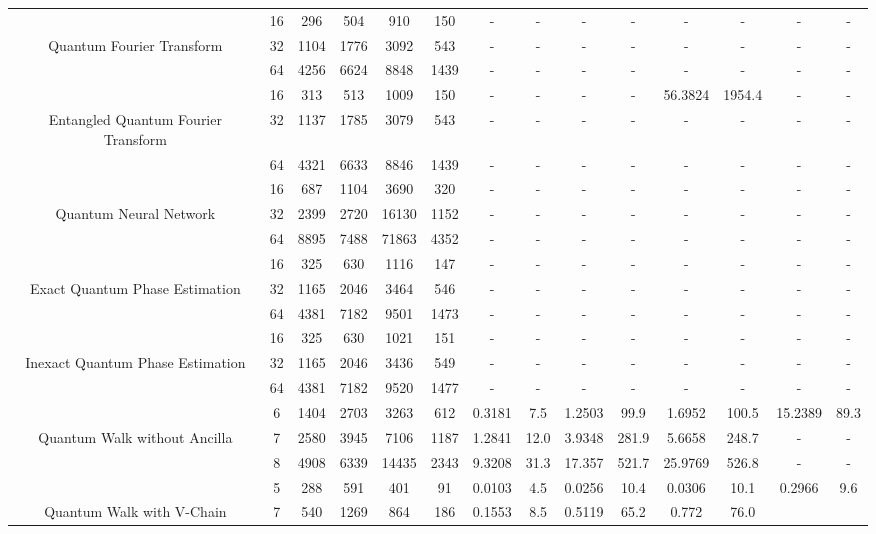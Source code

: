 \begin{table}[htb]
{\begin{tabular}{|c|c|c|c|c|c|c|c|c|c|c|c|c|c|}
\hline
 & 
16 & 296 & 504 & 910 & 150
 & - & -
 & - & -
 & - & -
 & - & -
 \\
Quantum Fourier Transform & 
32 & 1104 & 1776 & 3092 & 543
 & - & -
 & - & -
 & - & -
 & - & -
 \\
 & 
64 & 4256 & 6624 & 8848 & 1439
 & - & -
 & - & -
 & - & -
 & - & -
 \\
\hline
 & 
16 & 313 & 513 & 1009 & 150
 & - & -
 & - & -
 & 56.3824 & 1954.4
 & - & -
 \\
Entangled Quantum Fourier Transform & 
32 & 1137 & 1785 & 3079 & 543
 & - & -
 & - & -
 & - & -
 & - & -
 \\
 & 
64 & 4321 & 6633 & 8846 & 1439
 & - & -
 & - & -
 & - & -
 & - & -
 \\
\hline
 & 
16 & 687 & 1104 & 3690 & 320
 & - & -
 & - & -
 & - & -
 & - & -
 \\
Quantum Neural Network & 
32 & 2399 & 2720 & 16130 & 1152
 & - & -
 & - & -
 & - & -
 & - & -
 \\
 & 
64 & 8895 & 7488 & 71863 & 4352
 & - & -
 & - & -
 & - & -
 & - & -
 \\
\hline
 & 
16 & 325 & 630 & 1116 & 147
 & - & -
 & - & -
 & - & -
 & - & -
 \\
Exact Quantum Phase Estimation & 
32 & 1165 & 2046 & 3464 & 546
 & - & -
 & - & -
 & - & -
 & - & -
 \\
 & 
64 & 4381 & 7182 & 9501 & 1473
 & - & -
 & - & -
 & - & -
 & - & -
 \\
\hline
 & 
16 & 325 & 630 & 1021 & 151
 & - & -
 & - & -
 & - & -
 & - & -
 \\
Inexact Quantum Phase Estimation & 
32 & 1165 & 2046 & 3436 & 549
 & - & -
 & - & -
 & - & -
 & - & -
 \\
 & 
64 & 4381 & 7182 & 9520 & 1477
 & - & -
 & - & -
 & - & -
 & - & -
 \\
\hline
 & 
6 & 1404 & 2703 & 3263 & 612
 & 0.3181 & 7.5
 & 1.2503 & 99.9
 & 1.6952 & 100.5
 & 15.2389 & 89.3
 \\
Quantum Walk without Ancilla & 
7 & 2580 & 3945 & 7106 & 1187
 & 1.2841 & 12.0
 & 3.9348 & 281.9
 & 5.6658 & 248.7
 & - & -
 \\
 & 
8 & 4908 & 6339 & 14435 & 2343
 & 9.3208 & 31.3
 & 17.357 & 521.7
 & 25.9769 & 526.8
 & - & -
 \\
\hline
 & 
5 & 288 & 591 & 401 & 91
 & 0.0103 & 4.5
 & 0.0256 & 10.4
 & 0.0306 & 10.1
 & 0.2966 & 9.6
 \\
Quantum Walk with V-Chain & 
7 & 540 & 1269 & 864 & 186
 & 0.1553 & 8.5
 & 0.5119 & 65.2
 & 0.772 & 76.0

\end{tabular}}
\end{table}
